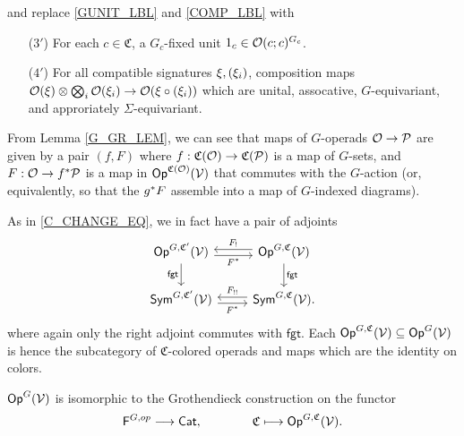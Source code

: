\documentclass[a4paper,10pt
,draft
]{article}%
\renewcommand{\1}{\eta}%
\begin{document}
\begin{example}
      and replace \ref{GUNIT_LBL} and \ref{COMP_LBL} with
      \begin{enumerate}
      \item[($3'$)] For each $c \in \mathfrak C$, a $G_c$-fixed unit $1_c \in \mathcal{O}(c;c)^{G_c}$.
      \item[($4'$)] For all compatible signatures $\xi, (\xi_i)$,
            composition maps $\mathcal{O}(\xi) \otimes \bigotimes_i \mathcal{O}(\xi_i) \to \mathcal{O}(\xi \circ (\xi_i))$
            which are unital, assocative, $G$-equivariant, and approriately $\Sigma$-equivariant.
      \end{enumerate}
      
      From Lemma \ref{G_GR_LEM}, we can see that
      maps of $G$-operads $\mathcal{O} \to \mathcal{P}$ are given by a pair $(f, F)$ where
      $f: \mathfrak C(\mathcal{O}) \to \mathfrak C(\mathcal{P})$ is a map of $G$-sets, and
      $F: \O \to f^{\**}\P$ is a map in $\mathsf{Op}^{\mathfrak C(\mathcal{O})}(\mathcal V)$ that commutes with the $G$-action
      (or, equivalently, so that the $g^{\**}F$ assemble into a map of $G$-indexed diagrams).
\end{example}

As in \eqref{C_CHANGE_EQ}, we in fact have a pair of adjoints
\begin{equation}
      \label{GC_CHANGE_EQ}
      \begin{tikzcd}
            \Op^{G, \mathfrak C'}(\V) \arrow[r, shift right, "F^{\**}"'] \arrow[d, "\mathsf{fgt}"']
            &
            \Op^{G, \mathfrak C}(\V) \arrow[l, shift right, "F_!"'] \arrow[d, "\mathsf{fgt}"]
            \\
            \Sym^{G, \mathfrak C'}(\V) \arrow[r, shift right, "F^{\**}"']
            &
            \Sym^{G, \mathfrak C}(\V) \arrow[l, shift right, "F_{!!}"'].
      \end{tikzcd}
\end{equation}
where again only the right adjoint commutes with $\mathsf{fgt}$. 
%
Each $\mathsf{Op}^{G, \mathfrak C}(\mathcal V) \subseteq \mathsf{Op}^G(\mathcal V)$
is hence the subcategory of $\mathfrak C$-colored operads and maps which are the identity on colors.

\begin{lemma}
      $\mathsf{Op}^G(\mathcal V)$ is isomorphic to the Grothendieck construction on the functor
      \begin{equation}
            \mathsf F^{G,op} \longrightarrow \mathsf{Cat},
            \qquad \qquad
            \mathfrak C \longmapsto \mathsf{Op}^{G, \mathfrak C}(\mathcal V).
      \end{equation}
\end{lemma}
\end{document}
